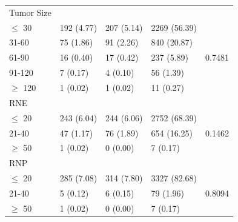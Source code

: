 \documentclass[times,sort&compress,3p]{elsarticle}
\theoremstyle{plain}
\theoremstyle{definition}
\begin{document}
\begin{table}[t]
\begin{tabular}{lllll}
Tumor Size                &              &                &                &                    \\
$\leq$ 30                      & 192 (4.77)   & 207 (5.14)     & 2269 (56.39)   &                    \\
31-60                     & 75 (1.86)    & 91 (2.26)      & 840 (20.87)    &                    \\
61-90                     & 16 (0.40)    & 17 (0.42)      & 237 (5.89)     & 0.7481             \\
91-120                    & 7 (0.17)     & 4 (0.10)       & 56 (1.39)      &                    \\
$\geq$ 120                     & 1 (0.02)     & 1 (0.02)       & 11 (0.27)      &                    \\ \hline
RNE                       &              &                &                &                    \\
$\leq$ 20                      & 243 (6.04)   & 244 (6.06)     & 2752 (68.39)   &                    \\
21-40                     & 47 (1.17)    & 76 (1.89)      & 654 (16.25)    & 0.1462             \\
$\geq$ 50                      & 1 (0.02)     & 0 (0.00)       & 7 (0.17)       &                    \\ \hline
RNP                       &              &                &                &                    \\
$\leq$ 20                      & 285 (7.08)   & 314 (7.80)     & 3327 (82.68)   &                    \\
21-40                     & 5 (0.12)     & 6 (0.15)       & 79 (1.96)      & 0.8094             \\
$\geq$ 50                      & 1 (0.02)     & 0 (0.00)       & 7 (0.17)       &    \\  \hline  \hline           
\end{tabular} 
\end{table}
\end{document}
